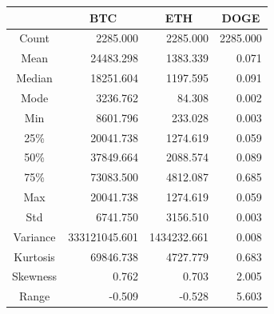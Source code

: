 \documentclass{ieeeojies}
\begin{document}
\begin{table}[H]
    \centering
    \renewcommand{\arraystretch}{1.2} %
    \begin{tabular}{|c|r|r|r|}
        \hline
                & \multicolumn{1}{c|}{\textbf{BTC}} & \multicolumn{1}{c|}{\textbf{ETH}} & \multicolumn{1}{c|}{\textbf{DOGE}} \\
        \hline
        Count    & 2285.000 & 2285.000 & 2285.000 \\
        \hline
        Mean     & 24483.298 & 1383.339 & 0.071 \\
        \hline
        Median   & 18251.604 & 1197.595 & 0.091 \\
        \hline
        Mode     & 3236.762 & 84.308 & 0.002 \\
        \hline
        Min      & 8601.796 & 233.028 & 0.003 \\
        \hline
        25\%     & 20041.738 & 1274.619 & 0.059 \\
        \hline
        50\%     & 37849.664 & 2088.574 & 0.089 \\
        \hline
        75\%     & 73083.500 & 4812.087 & 0.685 \\
        \hline
        Max      & 20041.738 & 1274.619 & 0.059 \\
        \hline
        Std      & 6741.750 & 3156.510 & 0.003 \\
        \hline
        Variance & 333121045.601 & 1434232.661 & 0.008 \\
        \hline
        Kurtosis & 69846.738 & 4727.779 & 0.683 \\
        \hline
        Skewness & 0.762 & 0.703 & 2.005 \\
        \hline
        Range    & -0.509 & -0.528 & 5.603 \\
        \hline
    \end{tabular}
\end{table}
\end{document}
